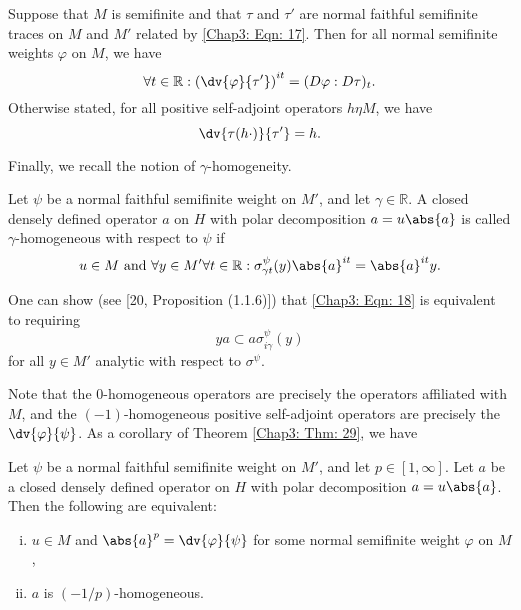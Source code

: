 \begin{corollary}
    Suppose that $M$ is semifinite and that $\tau$ and $\tau'$ are normal faithful semifinite traces on $M$ and $M'$ related by \eqref{Chap3: Eqn: 17}. Then for all normal semifinite weights $\varphi$ on $M$, we have
    \[
        \forall t\in \mathbb{R}:\left( \dv{\varphi}{\tau'} \right)^{it}=(D\varphi:D\tau)_t.
    \]
    Otherwise stated, for all positive self-adjoint operators $h\eta M$, we have
    \[
        \dv{\tau(h\cdot)}{\tau'}=h.
    \]
\end{corollary}
Finally, we recall the notion of $\gamma$-homogeneity.
\begin{definition}
    Let $\psi$ be a normal faithful semifinite weight on $M'$, and let $\gamma\in \mathbb{R}$. A closed densely defined operator $a$ on $H$ with polar decomposition $a=u\abs{a}$ is called $\gamma$-homogeneous with respect to $\psi$ if
    \begin{equation}\label{Chap3: Eqn: 18}
        u\in M \text{ and } \forall y\in M' \forall t\in \mathbb{R}: \sigma_{\gamma t}^\psi(y)\abs{a}^{it}=\abs{a}^{it}y.
    \end{equation}
\end{definition}
One can show (see [20, Proposition (1.1.6)]) that \eqref{Chap3: Eqn: 18} is equivalent to requiring
\begin{equation}
    ya\subset a\sigma_{i\gamma}^\psi(y)
\end{equation}
for all $y\in M'$ analytic with respect to $\sigma^\psi$.\par
Note that the 0-homogeneous operators are precisely the operators affiliated with $M$, and the $(-1)$-homogeneous positive self-adjoint operators are precisely the $\dv{\varphi}{\psi}$. As a corollary of Theorem \ref{Chap3: Thm: 29}, we have
\begin{corollary}
    Let $\psi$ be a normal faithful semifinite weight on $M'$, and let $p\in [1,\infty]$. Let $a$ be a closed densely defined operator on $H$ with polar decomposition $a=u\abs{a}$. Then the following are equivalent:
    \begin{enumerate}[(i)]
        \item $u\in M$ and $\abs{a}^p=\dv{\varphi}{\psi}$ for some normal semifinite weight $\varphi$ on $M$,
        \item $a$ is $(-1/p)$-homogeneous.
    \end{enumerate}
\end{corollary}
% 